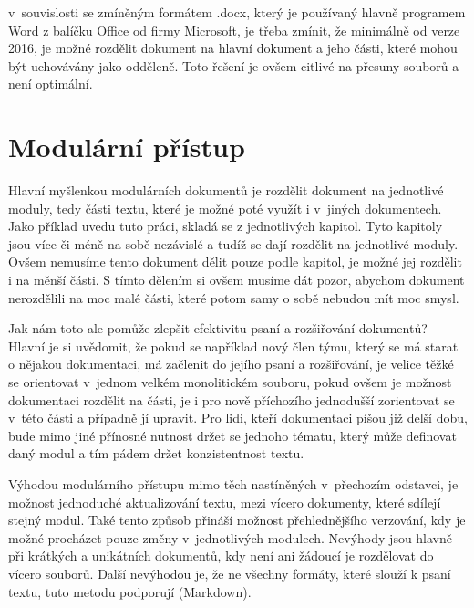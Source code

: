 v~souvislosti se zmíněným formátem .docx, který je používaný hlavně programem Word z balíčku Office od firmy Microsoft, je třeba zmínit, že minimálně od verze 2016, je
možné rozdělit dokument na hlavní dokument a jeho části, které mohou být uchovávány jako odděleně. \cite{msWord} Toto řešení je ovšem citlivé na přesuny souborů
a není optimální.

\section{Modulární přístup}

Hlavní myšlenkou modulárních dokumentů je rozdělit dokument na jednotlivé moduly, tedy části textu, které je možné poté využít i v~jiných dokumentech. Jako příklad uvedu
tuto práci, skladá se z jednotlivých kapitol. Tyto kapitoly jsou více či méně na sobě nezávislé a tudíž se dají rozdělit na jednotlivé moduly. Ovšem nemusíme tento
dokument dělit pouze podle kapitol, je možné jej rozdělit i na měnší části. S tímto dělením si ovšem musíme dát pozor, abychom dokument nerozdělili na moc malé části,
které potom samy o sobě nebudou mít moc smysl.

Jak nám toto ale pomůže zlepšit efektivitu psaní a rozšiřování dokumentů? Hlavní je si uvědomit, že pokud se například nový člen týmu, který se má starat o nějakou
dokumentaci, má začlenit do jejího psaní a rozšiřování, je velice těžké se orientovat v~jednom velkém monolitickém souboru, pokud ovšem je možnost dokumentaci rozdělit
na části, je i pro nově příchozího jednodušší zorientovat se v~této části a případně jí upravit. Pro lidi, kteří dokumentaci píšou již delší dobu, bude mimo jiné přínosné
nutnost držet se jednoho tématu, který může definovat daný modul a tím pádem držet konzistentnost textu. \cite{modularDocuments}

Výhodou modulárního přístupu mimo těch nastíněných v~přechozím odstavci, je možnost jednoduché aktualizování textu, mezi vícero dokumenty, které sdílejí stejný modul. Také
tento způsob přináší možnost přehlednějšího verzování, kdy je možné procházet pouze změny v~jednotlivých modulech. Nevýhody jsou hlavně při krátkých a unikátních dokumentů,
kdy není ani žádoucí je rozdělovat do vícero souborů. Další nevýhodou je, že ne všechny formáty, které slouží k psaní textu, tuto metodu podporují (Markdown).
